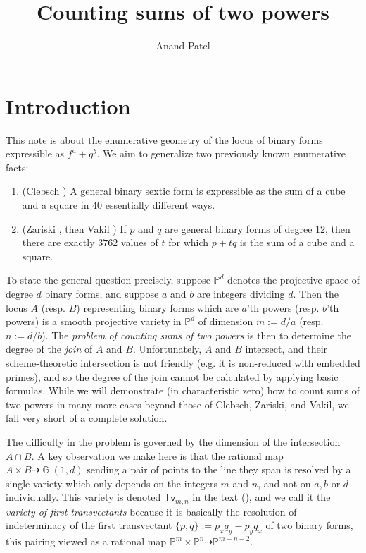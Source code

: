 \documentclass[reqno, 11pt]{amsart}
\author{Anand Patel}
\title{Counting sums of two powers}
\theoremstyle{plain}
\theoremstyle{remark}
\renewcommand{\P}{\mathbb{P}}
\DeclareMathOperator{\G}{\mathbb{G}}
\newcommand{\transvectant}{\mathsf{Tv}}
\begin{document}
\maketitle

\section{Introduction}
\label{section:introduction}


This note is about the enumerative geometry of the locus of binary forms expressible as $f^{a} + g^{b}$.  We aim to generalize two previously known enumerative facts: 
\begin{enumerate}
    \item[(I)] (Clebsch \cite{clebsch1870theorie}) A general binary sextic form is expressible as the sum of a cube and a square in $40$ essentially different ways.
    \item[(II)] (Zariski \cite{zariski1928hyperelliptic}, then Vakil \cite{vakil2001twelve}) If $p$ and $q$ are general binary forms of degree $12$, then there are exactly $3762$ values of $t$ for which $p + t q$ is the sum of a cube and a square.
\end{enumerate}

To state the general question precisely, suppose $\P^{d}$ denotes the projective space of degree $d$ binary forms, and suppose $a$ and $b$ are integers dividing $d$. Then the locus $A$ (resp. $B$) representing binary forms which are $a$'th powers (resp. $b$'th powers) is a smooth projective variety in $\P^{d}$ of dimension $m := d/a$ (resp. $n := d/b$).  The {\sl problem of  counting sums of two powers} is then to determine the degree of the {\sl join} of $A$ and $B$.  Unfortunately, $A$ and $B$ intersect, and their scheme-theoretic intersection is not friendly (e.g. it is non-reduced with embedded primes), and so the degree of the join cannot be calculated by applying basic formulas.  While we will demonstrate (in characteristic zero) how to count sums of two powers in many more cases beyond those of Clebsch, Zariski, and Vakil, we fall very short of a complete solution.  

The difficulty in the problem is governed by the dimension of the intersection $A \cap B$.  A key observation we make here is that the rational map $A \times B \dashrightarrow \G(1,d)$ sending a pair of points to the line they span is resolved by a single variety which only depends on the integers $m$ and $n$, and not on $a, b$ or $d$ individually.  This variety is denoted $\transvectant_{m,n}$ in the text (), and we call it the {\sl variety of first transvectants} because it is basically the resolution of indeterminacy of the first transvectant $\{p,q\} := p_{x}q_{y} - p_{y}q_{x}$ of two binary forms, this pairing viewed as a rational map $\P^{m} \times \P^{n} \dashrightarrow \P^{m+n-2}$.  
\end{document}
